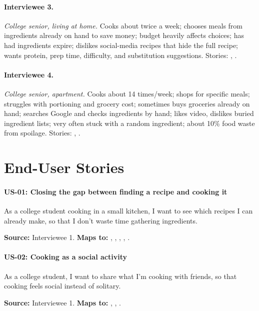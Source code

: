 \paragraph{Interviewee 3.} \textit{College senior, living at home.} Cooks about twice a week; chooses meals from ingredients already on hand to save money; budget heavily affects choices; has had ingredients expire; dislikes social-media recipes that hide the full recipe; wants protein, prep time, difficulty, and substitution suggestions. Stories: , .

\paragraph{Interviewee 4.} \textit{College senior, apartment.} Cooks about 14 times/week; shops for specific meals; struggles with portioning and grocery cost; sometimes buys groceries already on hand; searches Google and checks ingredients by hand; likes video, dislikes buried ingredient lists; very often stuck with a random ingredient; about 10\% food waste from spoilage. Stories: , .

\section{End-User Stories}

\paragraph{US-01: Closing the gap between finding a recipe and cooking it}
As a college student cooking in a small kitchen, I want to see which recipes I can already make, so that I don't waste time gathering ingredients.

\noindent\textbf{Source:} Interviewee 1. \textbf{Maps to:} , , , , .

\paragraph{US-02: Cooking as a social activity}
As a college student, I want to share what I'm cooking with friends, so that cooking feels social instead of solitary.

\noindent\textbf{Source:} Interviewee 1. \textbf{Maps to:} , , .

